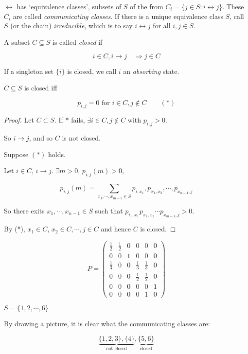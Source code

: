 \documentclass[a4paper]{article}
\begin{document}
$ \leftrightarrow $ has `equivalence classes', subsets of $ S $ of the from $ C_{i} = \{ j \in S : i \leftrightarrow j \} $. These $ C_{i} $ are called \emph{communicating classes}. If there is a unique equivalence class $ S $, call $ S $ (or the chain) \emph{irreducible}, which is to say $ i \leftrightarrow j $ for all $ i,j \in S $.

A subset $ C \subseteq S $ is called \emph{closed} if 

\[ i \in C, i \to j \quad \Rightarrow j \in C \]


If a singleton set $ \{ i \} $ is closed, we call $ i $ an \emph{absorbing} state.

\begin{prop} 
	$ C \subseteq S $ is closed iff
	
	\[ p_{i,j} = 0 \text{ for } i \in C, j \notin C   \qquad (*)  \]
	
\end{prop}

\begin{proof}
	Let $ C \subset S $. If $ * $ fails, $ \exists i \in C, j \notin C  $ with $ p_{i,j} > 0 $. 
	
	So $ i \to j $, and so $ C $ is not closed.
	
	Suppose $ (*) $ holds. 
	
	Let $ i \in C $, $ i \to j $. $ \exists m > 0 $, $ p_{i,j}(m) > 0 $,
	
	
	\[ p_{i,j}(m) = \sum_{x_{1},\cdots,x_{m-1} \in S} 
	p_{i,x_{1}},p_{x_{1},x_{2}},\cdots,p_{x_{n-1},j} \]
	
	
	So there exits $ x_{1},\cdots,x_{n-1} \in S $ such that $ p_{i_{1},x_{1}} p_{x_{1},x_{2}} \cdots p_{x_{m-1},j} > 0$.
	
	By (*), $ x_{1} \in C $, $ x_{2} \in C, \cdots, j \in C $ and hence $ C $ is closed. 
\end{proof}


\begin{eg}
	\[ P =  \begin{pmatrix}
		\frac{1}{2} & \frac{1}{2} & 0 & 0 & 0 & 0 \\
		0 & 0 & 1 & 0 & 0 & 0 \\
		\frac{1}{3} & 0 & 0 & \frac{1}{3} & \frac{1}{3} & 0 \\
		0 & 0 & 0 & \frac{1}{2} & \frac{1}{2} & 0 \\
		0 & 0 & 0 & 0 & 0 & 1 \\
	    0 & 0 & 0 & 0 & 1 & 0
	\end{pmatrix} \]

$ S = \{ 1,2,\cdots,6\} $


By drawing a picture, it is clear what the communicating classes are:

\[ \underbrace{\{1,2,3\},\{ 4\}}_{\text{ not closed }},\underbrace{\{ 5,6 \}}_{\text{ closed }} \] 
\end{eg}
\end{document}
